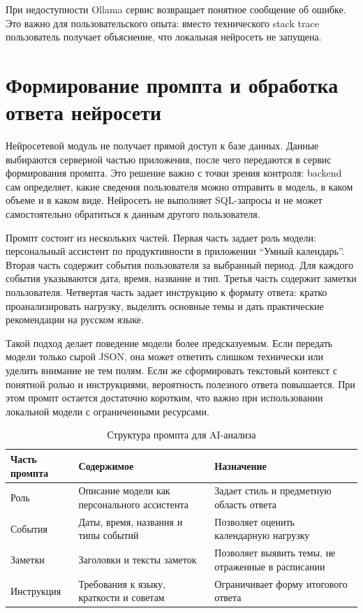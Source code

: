 \documentclass[14pt,a4paper]{extreport}
\begin{document}
При недоступности Ollama сервис возвращает понятное сообщение об ошибке. Это важно для пользовательского опыта: вместо технического stack trace пользователь получает объяснение, что локальная нейросеть не запущена.

\section{Формирование промпта и обработка ответа нейросети}

Нейросетевой модуль не получает прямой доступ к базе данных. Данные выбираются серверной частью приложения, после чего передаются в сервис формирования промпта. Это решение важно с точки зрения контроля: backend сам определяет, какие сведения пользователя можно отправить в модель, в каком объеме и в каком виде. Нейросеть не выполняет SQL-запросы и не может самостоятельно обратиться к данным другого пользователя.

Промпт состоит из нескольких частей. Первая часть задает роль модели: персональный ассистент по продуктивности в приложении ``Умный календарь''. Вторая часть содержит события пользователя за выбранный период. Для каждого события указываются дата, время, название и тип. Третья часть содержит заметки пользователя. Четвертая часть задает инструкцию к формату ответа: кратко проанализировать нагрузку, выделить основные темы и дать практические рекомендации на русском языке.

Такой подход делает поведение модели более предсказуемым. Если передать модели только сырой JSON, она может ответить слишком технически или уделить внимание не тем полям. Если же сформировать текстовый контекст с понятной ролью и инструкциями, вероятность полезного ответа повышается. При этом промпт остается достаточно коротким, что важно при использовании локальной модели с ограниченными ресурсами.

\begin{longtable}{|p{}|p{}|p{}|}
\caption{Структура промпта для AI-анализа}\\
\hline
\textbf{Часть промпта} & \textbf{Содержимое} & \textbf{Назначение}\\
\hline
Роль & Описание модели как персонального ассистента & Задает стиль и предметную область ответа\\
\hline
События & Даты, время, названия и типы событий & Позволяет оценить календарную нагрузку\\
\hline
Заметки & Заголовки и тексты заметок & Позволяет выявить темы, не отраженные в расписании\\
\hline
Инструкция & Требования к языку, краткости и советам & Ограничивает форму итогового ответа\\
\hline
\end{longtable}
\end{document}

